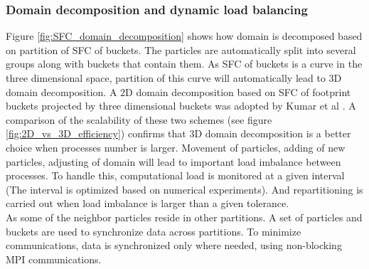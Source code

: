 \documentclass[conference,compsoc]{IEEEtran}
\begin{document}
\subsubsection{Domain decomposition and dynamic load balancing}
Figure \ref{fig:SFC_domain_decomposition} shows how domain is decomposed based on partition of SFC of buckets. The particles are automatically split into several groups along with buckets that contain them. As SFC of buckets is a curve in the three dimensional space, partition of this curve will automatically lead to 3D domain decomposition. A 2D domain decomposition based on SFC of footprint buckets projected by three dimensional buckets was adopted by Kumar et al \cite{kumar2013parallel}. A comparison of the scalability of these two schemes (see figure \ref{fig:2D_vs_3D_efficiency}) confirms that 3D domain decomposition is a better choice when processes number is larger. 
Movement of particles, adding of new particles, adjusting of domain will lead to important load imbalance between processes. To handle this, computational load is monitored at a given interval (The interval is optimized based on numerical experiments). And repartitioning is carried out when load imbalance is larger than a given tolerance.
\\
As some of the neighbor particles reside in other partitions. A set of  particles and buckets are used to synchronize data across partitions. To minimize communications, data is synchronized only where needed, using non-blocking MPI communications. 
\end{document}
